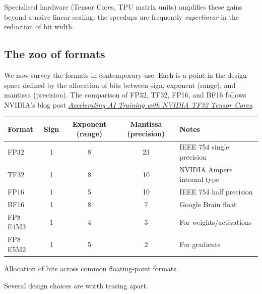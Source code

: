 \documentclass[11pt,a4paper]{article}
\theoremstyle{definition}
\theoremstyle{remark}
\theoremstyle{plain}
\begin{document}
Specialised hardware (Tensor Cores, TPU matrix units) amplifies these
gains beyond a naive linear scaling: the speedups are frequently
\emph{superlinear} in the reduction of bit width.

\subsection{The zoo of formats}

We now survey the formats in contemporary use. Each is a point in the
design space defined by the allocation of bits between sign, exponent
(range), and mantissa (precision). The comparison of FP32, TF32, FP16, and
BF16 follows NVIDIA's blog post
\href{https://developer.nvidia.com/blog/accelerating-ai-training-with-tf32-tensor-cores/}{\textit{Accelerating
AI Training with NVIDIA TF32 Tensor Cores}}.

\begin{center}
\renewcommand{\arraystretch}{1.25}
\setlength{\tabcolsep}{4pt}
\small
\begin{tabular}{@{}lcccl@{}}
\toprule
\textbf{Format} & \textbf{Sign} & \textbf{Exponent (range)} &
\textbf{Mantissa (precision)} & \textbf{Notes} \\
\midrule
FP32 & 1 & 8 & 23 & IEEE 754 single precision \\
TF32 & 1 & 8 & 10 & NVIDIA Ampere internal type \\
FP16 & 1 & 5 & 10 & IEEE 754 half precision \\
BF16 & 1 & 8 & 7 & Google Brain float \\
FP8 E4M3 & 1 & 4 & 3 & For weights/activations \\
FP8 E5M2 & 1 & 5 & 2 & For gradients \\
\bottomrule
\end{tabular}
\par\smallskip
{\small Allocation of bits across common floating-point formats.}
\end{center}

Several design choices are worth teasing apart.
\end{document}
